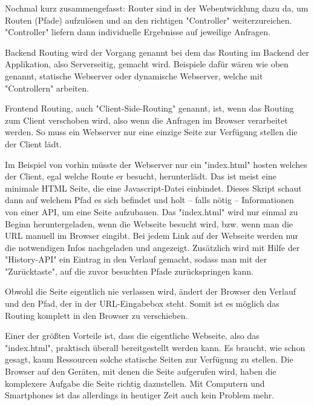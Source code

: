 Nochmal kurz zusammengefasst: Router sind in der Webentwicklung dazu da, um Routen (Pfade) aufzulösen und an den richtigen "Controller" weiterzureichen. "Controller" liefern dann individuelle Ergebnisse auf jeweilige Anfragen.


Backend Routing wird der Vorgang genannt bei dem das Routing im Backend der Applikation, also Serverseitig, gemacht wird. Beispiele dafür wären wie oben genannt, statische Webserver oder dynamische Webserver, welche mit "Controllern" arbeiten.


Frontend Routing, auch "Client-Side-Routing" genannt, ist, wenn das Routing zum Client verschoben wird, also wenn die Anfragen im Browser verarbeitet werden. So muss ein Webserver nur eine einzige Seite zur Verfügung stellen die der Client lädt.

Im Beispiel von vorhin müsste der Webserver nur ein "{\ttfamily index.html}" hosten welches der Client, egal welche Route er besucht, herunterlädt. Das ist meist eine minimale HTML Seite, die eine Javascript-Datei einbindet. Dieses Skript schaut dann auf welchem Pfad es sich befindet und holt -- falls nötig -- Informationen von einer API, um eine Seite aufzubauen. Das "{\ttfamily index.html}" wird nur einmal zu Beginn heruntergeladen, wenn die Webseite besucht wird, bzw. wenn man die URL manuell im Browser eingibt. Bei jedem Link auf der Webseite werden nur die notwendigen Infos nachgeladen und angezeigt. Zusätzlich wird mit Hilfe der "History-API" ein Eintrag in den Verlauf gemacht, sodass man mit der "Zurücktaste", auf die zuvor besuchten Pfade zurückspringen kann.

Obwohl die Seite eigentlich nie verlassen wird, ändert der Browser den Verlauf und den Pfad, der in der URL-Eingabebox steht. Somit ist es möglich das Routing komplett in den Browser zu verschieben.


Einer der größten Vorteile ist, dass die eigentliche Webseite, also das "{\ttfamily index.html}", praktisch überall bereitgestellt werden kann. Es braucht, wie schon gesagt, kaum Ressourcen solche statische Seiten zur Verfügung zu stellen. Die Browser auf den Geräten, mit denen die Seite aufgerufen wird, haben die komplexere Aufgabe die Seite richtig dazustellen. Mit Computern und Smartphones ist das allerdings in heutiger Zeit auch kein Problem mehr.

